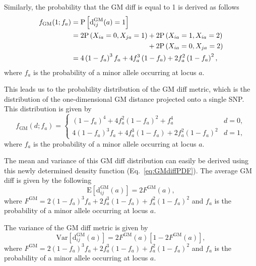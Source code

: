 \documentclass[aos]{imsart}
\begin{document}
Similarly, the probability that the GM diff is equal to 1 is derived as follows
%
\begin{equation}\label{eq:probGM1}
\begin{aligned}
f_\text{GM}(1;f_a) &= \text{P}\left[\text{d}^\text{GM}_{ij}(a) = 1\right]\\
&= 2\text{P}\left(X_{ia}=0,X_{ja}=1\right) + 2\text{P}\left(X_{ia}=1,X_{ia}=2\right) \\
& \hspace{3.81cm} + 2\text{P}\left(X_{ia}=0,X_{ja}=2\right) \\
&= 4\left(1 - f_a\right)^3 f_a + 4 f^3_a \left(1 - f_a\right) + 2 f^2_a \left(1 - f_a\right)^2,
\end{aligned}
\end{equation}
%
where $f_a$ is the probability of a minor allele occurring at locus $a$.

This leads us to the probability distribution of the GM diff metric, which is the distribution of the one-dimensional GM distance projected onto a single SNP. This distribution is given by
%
\begin{equation}\label{eq:GMdiffPDF}
f_\text{GM}(d;f_a) = \begin{cases}
\left(1 - f_a\right)^4 + 4 f^2_a \left(1 - f_a\right)^2 + f^4_a & d=0, \\
4\left(1 - f_a\right)^3 f_a + 4 f^3_a \left(1 - f_a\right) + 2 f^2_a \left(1 - f_a\right)^2 & d=1,
\end{cases}
\end{equation}
%
where $f_a$ is the probability of a minor allele occurring at locus $a$. 

The mean and variance of this GM diff distribution can easily be derived using this newly determined density function (Eq.~\ref{eq:GMdiffPDF}). The average GM diff is given by the following
%
\begin{equation}\label{eq:GMdiffMean}
\text{E}\left[\text{d}^\text{GM}_{ij}(a)\right] = 2 F^\text{GM}(a),
\end{equation}
%
where $F^\text{GM} = 2 \left(1 - f_a\right)^3 f_a + 2 f^3_a \left(1 - f_a\right) + f^2_a \left(1 - f_a\right)^2$ and $f_a$ is the probability of a minor allele occurring at locus $a$.

The variance of the GM diff metric is given by
%
\begin{equation}\label{eq:GMdiffVar}
\text{Var}\left[\text{d}^\text{GM}_{ij}(a)\right] = 2 F^\text{GM}(a)\left[1 - 2 F^\text{GM}(a)\right],
\end{equation}
%
where $F^\text{GM} = 2 \left(1 - f_a\right)^3 f_a + 2 f^3_a \left(1 - f_a\right) + f^2_a \left(1 - f_a\right)^2$ and $f_a$ is the probability of a minor allele occurring at locus $a$.
\end{document}
